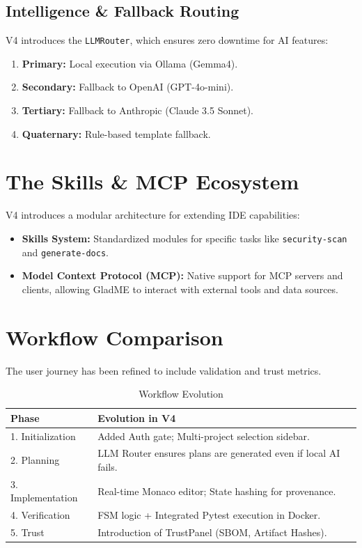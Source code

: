 \documentclass{article}
\begin{document}
\subsection{Intelligence & Fallback Routing}
V4 introduces the \texttt{LLMRouter}, which ensures zero downtime for AI features:
\begin{enumerate}
    \item \textbf{Primary:} Local execution via Ollama (Gemma4).
    \item \textbf{Secondary:} Fallback to OpenAI (GPT-4o-mini).
    \item \textbf{Tertiary:} Fallback to Anthropic (Claude 3.5 Sonnet).
    \item \textbf{Quaternary:} Rule-based template fallback.
\end{enumerate}

\section{The Skills & MCP Ecosystem}
V4 introduces a modular architecture for extending IDE capabilities:
\begin{itemize}
    \item \textbf{Skills System:} Standardized modules for specific tasks like \texttt{security-scan} and \texttt{generate-docs}.
    \item \textbf{Model Context Protocol (MCP):} Native support for MCP servers and clients, allowing GladME to interact with external tools and data sources.
\end{itemize}

\section{Workflow Comparison}
The user journey has been refined to include validation and trust metrics.

\begin{longtable}{@{}p{}p{}@{}}
\caption{Workflow Evolution} \\
\toprule
\textbf{Phase} & \textbf{Evolution in V4} \\ \midrule
1. Initialization & Added Auth gate; Multi-project selection sidebar. \\
2. Planning & LLM Router ensures plans are generated even if local AI fails. \\
3. Implementation & Real-time Monaco editor; State hashing for provenance. \\
4. Verification & FSM logic + Integrated Pytest execution in Docker. \\
5. Trust & Introduction of TrustPanel (SBOM, Artifact Hashes). \\
\bottomrule
\end{longtable}
\end{document}
